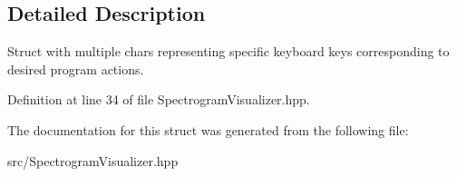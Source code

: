 \subsection{Detailed Description}
Struct with multiple char\textquotesingle{}s representing specific keyboard keys corresponding to desired program actions. 

Definition at line 34 of file Spectrogram\+Visualizer.\+hpp.



The documentation for this struct was generated from the following file\+:\begin{DoxyCompactItemize}
\item 
src/Spectrogram\+Visualizer.\+hpp\end{DoxyCompactItemize}
